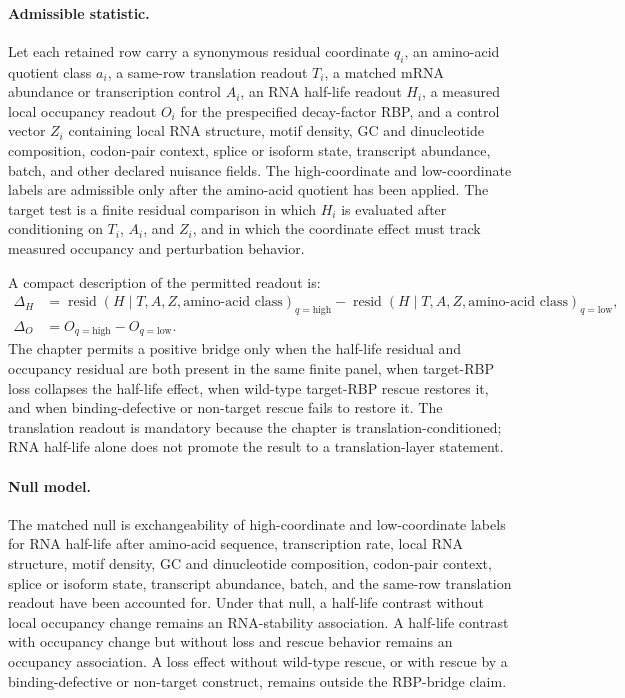 \paragraph{Admissible statistic.}
Let each retained row carry a synonymous residual coordinate $q_i$, an amino-acid quotient class $a_i$, a same-row translation readout $T_i$, a matched mRNA abundance or transcription control $A_i$, an RNA half-life readout $H_i$, a measured local occupancy readout $O_i$ for the prespecified decay-factor RBP, and a control vector $Z_i$ containing local RNA structure, motif density, GC and dinucleotide composition, codon-pair context, splice or isoform state, transcript abundance, batch, and other declared nuisance fields.  The high-coordinate and low-coordinate labels are admissible only after the amino-acid quotient has been applied.  The target test is a finite residual comparison in which $H_i$ is evaluated after conditioning on $T_i$, $A_i$, and $Z_i$, and in which the coordinate effect must track measured occupancy and perturbation behavior.

A compact description of the permitted readout is:
$$
\begin{aligned}
\Delta_H &= \operatorname{resid}(H \mid T,A,Z,\text{amino-acid class})_{q=\mathrm{high}} - \operatorname{resid}(H \mid T,A,Z,\text{amino-acid class})_{q=\mathrm{low}},\\
\Delta_O &= O_{q=\mathrm{high}} - O_{q=\mathrm{low}}.
\end{aligned}
$$
The chapter permits a positive bridge only when the half-life residual and occupancy residual are both present in the same finite panel, when target-RBP loss collapses the half-life effect, when wild-type target-RBP rescue restores it, and when binding-defective or non-target rescue fails to restore it.  The translation readout is mandatory because the chapter is translation-conditioned; RNA half-life alone does not promote the result to a translation-layer statement.

\paragraph{Null model.}
The matched null is exchangeability of high-coordinate and low-coordinate labels for RNA half-life after amino-acid sequence, transcription rate, local RNA structure, motif density, GC and dinucleotide composition, codon-pair context, splice or isoform state, transcript abundance, batch, and the same-row translation readout have been accounted for.  Under that null, a half-life contrast without local occupancy change remains an RNA-stability association.  A half-life contrast with occupancy change but without loss and rescue behavior remains an occupancy association.  A loss effect without wild-type rescue, or with rescue by a binding-defective or non-target construct, remains outside the RBP-bridge claim.

